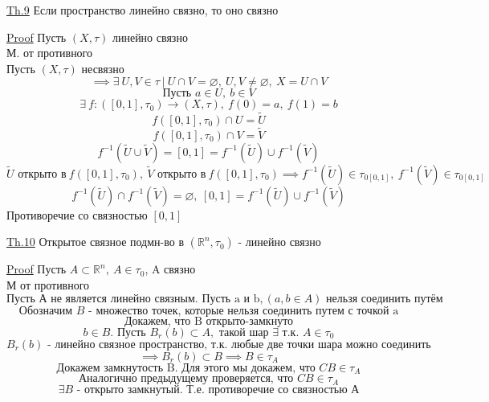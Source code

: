\documentclass[a4paper]{article}
\begin{document}
\begin{tcolorbox}
\underline{Th.9} Если пространство линейно связно, то оно связно

\underline{Proof} Пусть $ (X, \tau) $ линейно связно\\
М. от противного\\
Пусть $ (X, \tau) $ несвязно
\[
    \implies \exists\ U,V \in \tau \ | \ U \cap V = \varnothing, \ U,V \neq \varnothing,
    \ X = U \cap V
\]
\[
    \text{Пусть } a \in U, \ b \in V
\]
\[
    \exists \ f: ([0,1], \tau_0) \to (X, \tau), \ f(0) = a, \ f(1) = b
\]
\[
    f([0,1],\tau_0) \cap U = \tilde{U}
\]
\[
    f([0,1],\tau_0) \cap V = \tilde{V}
\]
\[
    f^{-1}(\tilde{U} \cup \tilde{V}) = [0,1] = f^{-1}(\tilde{U}) \cup f^{-1}(\tilde{V})
\]
\[
    \tilde{U} \text{ открыто в}\ f([0,1], \tau_0), \ \tilde{V} \text{ открыто в}\ 
    f([0,1],\tau_0) \implies f^{-1}(\tilde{U}) \in \tau_{0[0,1]}, \ f^{-1}(\tilde{V})
    \in \tau_{0[0,1]}
\]
\[
    f^{-1}(\tilde{U}) \cap f^{-1}(\tilde{V}) = \varnothing, \ [0,1] = f^{-1}(\tilde{U})
    \cup f^{-1}(\tilde{V})
\]
Противоречие со связностью $ [0,1] $ 
\end{tcolorbox}

\begin{tcolorbox}
\underline{Th.10} Открытое связное подмн-во в $ (\mathbb{R}^{n}, \tau_0) $ - линейно
связно

\underline{Proof} Пусть $ A \subset \mathbb{R}^{n},\ A \in \tau_0 $, A связно \\
М от противного
\[
    \text{Пусть А не является линейно связным.} \text{ Пусть a и b}, (a,b \in A)
    \text{ нельзя соединить путём}
\]
\[
    \text{Обозначим } B \text{ - множество точек, которые нельзя соединить путем
    с точкой a}
\]
\[
    \text{Докажем, что B открыто-замкнуто}
\]
\[
    b \in B. \text{ Пусть } B_r(b) \subset A, \text{ такой шар } \exists \text{ т.к. }
    A \in \tau_0
\]
\[
    B_r(b) \text{ - линейно связное пространство, т.к. любые две точки шара можно
    соединить отрезком}
\]
\[
    \implies B_r(b) \subset B \implies B \in \tau_A
\]
\[
    \text{Докажем замкнутость B. Для этого мы докажем, что } CB \in \tau_A
\]
\[
    \text{Аналогично предыдущему проверяется, что } CB \in \tau_A
\]
\[
    \exists B \text{ - открыто замкнутый. Т.е. противоречие со связностью А}
\]
\end{tcolorbox}
\end{document}
